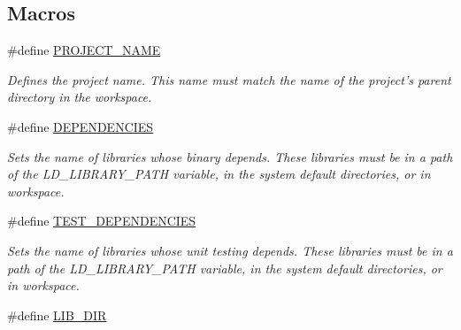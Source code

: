 \subsection*{Macros}
\begin{DoxyCompactItemize}
\item 
\hypertarget{group___project___variables_gae73053051efbb45c3a39751f5ce9fb36}{\#define \hyperlink{group___project___variables_gae73053051efbb45c3a39751f5ce9fb36}{P\+R\+O\+J\+E\+C\+T\+\_\+\+N\+A\+M\+E}}\label{group___project___variables_gae73053051efbb45c3a39751f5ce9fb36}

\begin{DoxyCompactList}\small\item\em Defines the project name. This name must match the name of the project's parent directory in the workspace. \end{DoxyCompactList}\item 
\hypertarget{group___project___variables_gad661cebbb68b497f00fba5676c36eaea}{\#define \hyperlink{group___project___variables_gad661cebbb68b497f00fba5676c36eaea}{D\+E\+P\+E\+N\+D\+E\+N\+C\+I\+E\+S}}\label{group___project___variables_gad661cebbb68b497f00fba5676c36eaea}

\begin{DoxyCompactList}\small\item\em Sets the name of libraries whose binary depends. These libraries must be in a path of the L\+D\+\_\+\+L\+I\+B\+R\+A\+R\+Y\+\_\+\+P\+A\+T\+H variable, in the system default directories, or in workspace. \end{DoxyCompactList}\item 
\hypertarget{group___project___variables_ga36eaa1244b8f912226a6211c0300afd1}{\#define \hyperlink{group___project___variables_ga36eaa1244b8f912226a6211c0300afd1}{T\+E\+S\+T\+\_\+\+D\+E\+P\+E\+N\+D\+E\+N\+C\+I\+E\+S}}\label{group___project___variables_ga36eaa1244b8f912226a6211c0300afd1}

\begin{DoxyCompactList}\small\item\em Sets the name of libraries whose unit testing depends. These libraries must be in a path of the L\+D\+\_\+\+L\+I\+B\+R\+A\+R\+Y\+\_\+\+P\+A\+T\+H variable, in the system default directories, or in workspace. \end{DoxyCompactList}\item 
\hypertarget{group___project___variables_ga84125bd283e4810d75a8be644b522672}{\#define \hyperlink{group___project___variables_ga84125bd283e4810d75a8be644b522672}{L\+I\+B\+\_\+\+D\+I\+R}}\label{group___project___variables_ga84125bd283e4810d75a8be644b522672}


\end{DoxyCompactItemize}
